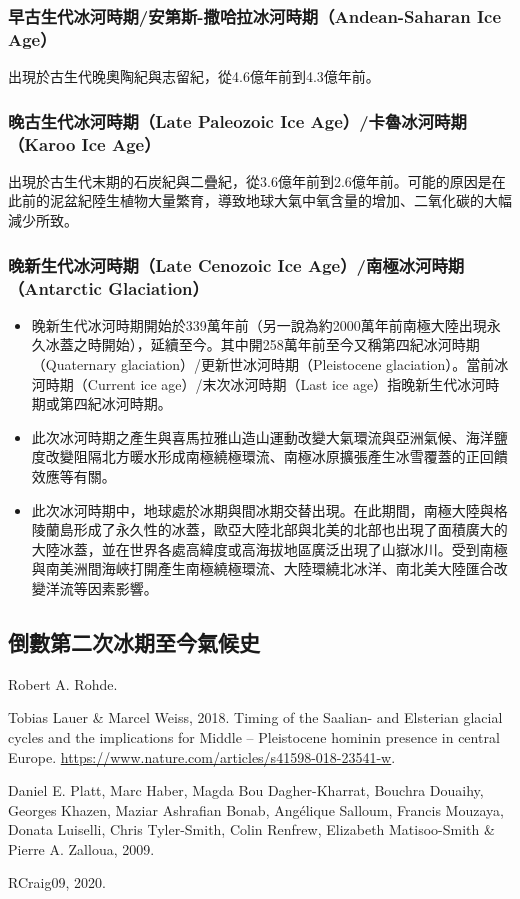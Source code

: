 \documentclass[a4paper,12pt]{report}
\begin{document}
\subsubsection{早古生代冰河時期/安第斯-撒哈拉冰河時期（Andean-Saharan Ice Age）}
出現於古生代晚奧陶紀與志留紀，從4.6億年前到4.3億年前。
\subsubsection{晚古生代冰河時期（Late Paleozoic Ice Age）/卡魯冰河時期（Karoo Ice Age）}
出現於古生代末期的石炭紀與二疊紀，從3.6億年前到2.6億年前。可能的原因是在此前的泥盆紀陸生植物大量繁育，導致地球大氣中氧含量的增加、二氧化碳的大幅減少所致。
\subsubsection{晚新生代冰河時期（Late Cenozoic Ice Age）/南極冰河時期（Antarctic Glaciation）}
\begin{itemize}
\item 晚新生代冰河時期開始於339萬年前（另一說為約2000萬年前南極大陸出現永久冰蓋之時開始），延續至今。其中開258萬年前至今又稱第四紀冰河時期（Quaternary glaciation）/更新世冰河時期（Pleistocene glaciation）。當前冰河時期（Current ice age）/末次冰河時期（Last ice age）指晚新生代冰河時期或第四紀冰河時期。
\item 此次冰河時期之產生與喜馬拉雅山造山運動改變大氣環流與亞洲氣候、海洋鹽度改變阻隔北方暖水形成南極繞極環流、南極冰原擴張產生冰雪覆蓋的正回饋效應等有關。
\item 此次冰河時期中，地球處於冰期與間冰期交替出現。在此期間，南極大陸與格陵蘭島形成了永久性的冰蓋，歐亞大陸北部與北美的北部也出現了面積廣大的大陸冰蓋，並在世界各處高緯度或高海拔地區廣泛出現了山嶽冰川。受到南極與南美洲間海峽打開產生南極繞極環流、大陸環繞北冰洋、南北美大陸匯合改變洋流等因素影響。
\end{itemize}
\subsection{倒數第二次冰期至今氣候史}
\bct\bfH\ctr{}\caption{Robert A. Rohde.}\ef\FB\ect\bct\bfH\ctr{}\caption{Tobias Lauer \& Marcel Weiss, 2018. Timing of the Saalian- and Elsterian glacial cycles and the implications for Middle – Pleistocene hominin presence in central Europe. \href{https://www.nature.com/articles/s41598-018-23541-w}{https://www.nature.com/articles/s41598-018-23541-w}.}\ef\FB\ect\bct\bfH\ctr{}\caption{Daniel E. Platt, Marc Haber, Magda Bou Dagher-Kharrat, Bouchra Douaihy, Georges Khazen, Maziar Ashrafian Bonab, Angélique Salloum, Francis Mouzaya, Donata Luiselli, Chris Tyler-Smith, Colin Renfrew, Elizabeth Matisoo-Smith \& Pierre A. Zalloua, 2009.}\ef\FB\ect\bct\bfH\ctr{}\caption{RCraig09, 2020.}\ef\FB\ect
\end{document}
